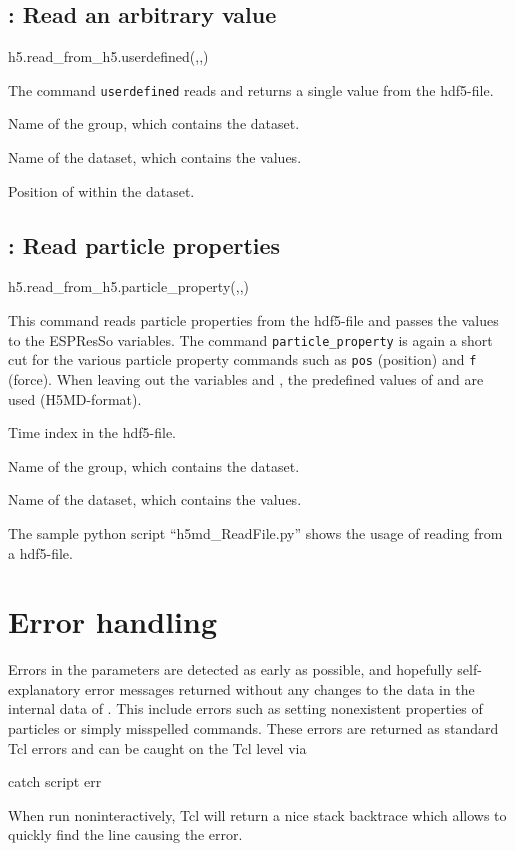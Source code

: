 \subsection{: Read an arbitrary value}
\begin{pyessyntax}
h5.read_from_h5.userdefined(,,)
\end{pyessyntax}
The command \texttt{userdefined} reads and returns a single value from the hdf5-file. 
\begin{arguments}
\item[\var{groupname}] Name of the group, which contains the dataset.
\item[\var{datasetname}] Name of the dataset, which contains the values.
\item[\var{datasetindex}] Position of  within the dataset.
\end{arguments}

\subsection{: Read particle properties}
\begin{pyessyntax}
h5.read_from_h5.particle_property(,,)
\end{pyessyntax}
This command reads particle properties from the hdf5-file and passes the values to the ESPResSo variables. The command \texttt{particle_property} is again a short cut for the various particle property commands such as \texttt{pos} (position) and \texttt{f} (force). When leaving out the variables  and , the predefined values of  and  are used (H5MD-format). 
\begin{arguments}
\item[\var{timestep}] Time index in the hdf5-file. 
\item[\var{groupname}] Name of the group, which contains the dataset.
\item[\var{datasetname}] Name of the dataset, which contains the values.
\end{arguments}
The sample python script ``h5md_ReadFile.py'' shows the usage of reading from a hdf5-file.



\section{Error handling}
Errors in the parameters are detected as early as possible, and
hopefully self-explanatory error messages returned without any changes
to the data in the internal data of \es. This include errors such as
setting nonexistent properties of particles or simply misspelled
commands. These errors are returned as standard Tcl errors and can be
caught on the Tcl level via
\begin{tclcode}
catch {script} err 
\end{tclcode}
When run noninteractively, Tcl will return a nice stack backtrace
which allows to quickly find the line causing the error.

